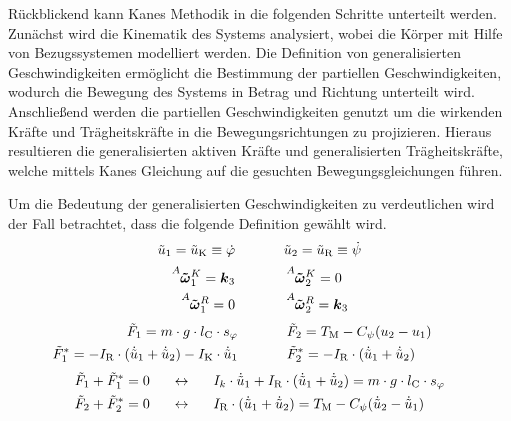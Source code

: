 Rückblickend kann Kanes Methodik in die folgenden Schritte unterteilt werden. Zunächst wird die Kinematik des Systems analysiert, wobei die Körper mit Hilfe von Bezugssystemen modelliert werden. Die Definition von generalisierten Geschwindigkeiten ermöglicht die Bestimmung der partiellen Geschwindigkeiten, wodurch die Bewegung des Systems in Betrag und Richtung unterteilt wird. Anschließend werden die partiellen Geschwindigkeiten genutzt um die wirkenden Kräfte und Trägheitskräfte in die Bewegungsrichtungen zu projizieren. Hieraus resultieren die generalisierten aktiven Kräfte und generalisierten Trägheitskräfte, welche mittels Kanes Gleichung auf die gesuchten Bewegungsgleichungen führen.

Um die Bedeutung der generalisierten Geschwindigkeiten zu verdeutlichen wird der Fall betrachtet, dass die folgende Definition gewählt wird.
\begin{equation}
\tilde{u}_{\text{1}} = \tilde{u}_{\text{K}} \equiv \dot{\varphi} \hspace{35pt} \tilde{u}_{\text{2}} = \tilde{u}_{\text{R}} \equiv \dot{\psi}
\end{equation}
\begin{equation}
\begin{split}
\vel{A}{\tilde{\omega}}{K}\idx{1} = \bs{k}\idx{3} &\hspace{35pt} \vel{A}{\tilde{\omega}}{K}\idx{2} = 0
\\
\vel{A}{\tilde{\omega}}{R}\idx{1} = 0 &\hspace{35pt} \vel{A}{\tilde{\omega}}{R}\idx{2} = \bs{k}\idx{3}
\end{split}
\end{equation}
\begin{equation}
\begin{split}
\tilde{F}_{\text{1}} = m\cdot g\cdot l_{\text{C}}\cdot s_{\varphi} \hspace{35pt}& \tilde{F}_{\text{2}} = T_{\text{M}} - C_{\psi}(u_{\text{2}}-u_{\text{1}}) \hspace{25pt}
\\
\tilde{F}^*_{\text{1}} = -I_{\text{R}}\cdot (\dot{\tilde{u}}_{\text{1}} + \dot{\tilde{u}}_{\text{2}}) - I_{\text{K}}\cdot \dot{\tilde{u}}_{\text{1}} \hspace{35pt}& \tilde{F}^*_{\text{2}} = -I_{\text{R}}\cdot (\dot{\tilde{u}}_{\text{1}} + \dot{\tilde{u}}_{\text{2}})\hspace{10pt}
\end{split}
\end{equation}
\begin{align}
\tilde{F}_{\text{1}} + \tilde{F}^*_{\text{1}} = 0 &\hspace{15pt}\leftrightarrow\hspace{15pt} I_k\cdot \dot{\tilde{u}}_{\text{1}} + I_{\text{R}}\cdot (\dot{\tilde{u}}_{\text{1}}+\dot{\tilde{u}}_{\text{2}}) = m\cdot g\cdot l_{\text{C}}\cdot s_{\varphi} \label{tilde_bwg_1}
\\
\tilde{F}_{\text{2}} + \tilde{F}^*_{\text{2}} = 0 &\hspace{15pt}\leftrightarrow\hspace{15pt} I_{\text{R}}\cdot (\dot{\tilde{u}}_{\text{1}}+\dot{\tilde{u}}_{\text{2}}) = T_{\text{M}} - C_{\psi}(\dot{\tilde{u}}_{\text{2}} - \dot{\tilde{u}}_{\text{1}}) \label{tilde_bwg_2}
\end{align}
